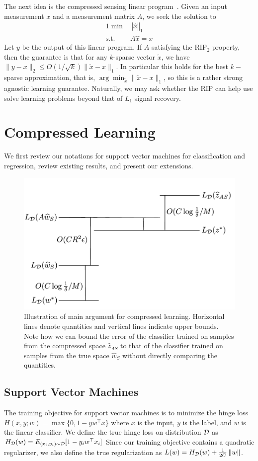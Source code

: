 \documentclass[english]{article}
\theoremstyle{plain}
\DeclareMathOperator{\st}{s.t.}
\begin{document}
The next idea is the compressed sensing linear program~\citep{Candes2006}.
Given an input measurement $x$ and a measurement matrix $A$, we seek the solution to
\begin{alignat*}{1}
\min & \left\Vert \widehat{x}\right\Vert _{1}\\
\st & A\widehat{x}=x
\end{alignat*}
Let $y$ be the output of this linear program.
If $A$ satisfying the RIP$_2$ property, then the guarantee is that for any $k$-sparse vector $\tilde{x}$, we have $\|y - x\|_2 \le O(1/\sqrt{k}) \|\tilde{x}-x\|_1$.
In particular this holds for the best $k-$sparse approximation, that is, $\arg\min_{\tilde{x}} \|\tilde{x}-x\|_1$, so this is a rather strong agnostic learning guarantee.
Naturally, we may ask whether the RIP can help use solve learning problems beyond that of $L_1$ signal recovery.

\section{Compressed Learning}
We first review our notations for support vector machines for classification and regression, review existing results, and present our extensions.

\begin{figure}
    \centering
    \includegraphics[width=0.6\columnwidth]{bounds_argument_figure.pdf}
    \caption{
Illustration of main argument for compressed learning.
Horizontal lines denote quantities and vertical lines indicate upper bounds.
Note how we can bound the error of the classifier trained on samples from the compressed space $\widehat{z}_{AS}$ to that of the classifier trained on samples from the true space $\widehat{w}_S$ without directly comparing the quantities.
}
    \label{fig:bounds_argument} 

\end{figure}
\subsection{Support Vector Machines}
The training objective for support vector machines is to minimize the hinge loss $H(x,y;w) = \max\{0, 1 - yw^\top x\}$ where $x$ is the input, $y$ is the label, and $w$ is the linear classifier.
We define the true hinge loss on distribution $\cal D$ as $H_{\cal D}(w) = E_{(x_i,y_i) \sim {\cal D}} [1 - y_i w^\top x_i]$
Since our training objective contains a quadratic regularizer, we also define the true regularization as $L(w) = H_{\cal D}(w) + \frac{1}{2C}\left\Vert w \right\Vert$.
\end{document}
